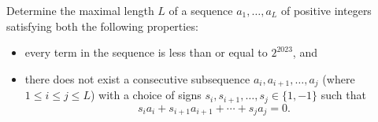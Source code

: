 Determine the maximal length $L$ of a sequence $a_1, \ldots, a_L$ of positive integers satisfying both the following properties:

\begin{itemize}
\item every term in the sequence is less than or equal to $2^{2023}$, and
\item there does not exist a consecutive subsequence $a_i, a_{i+1}, \ldots, a_j$ (where $1 \leq i \leq j \leq L$) with a choice of signs $s_i, s_{i+1}, \ldots, s_j \in \{1, -1\}$ such that
\[
s_i a_i + s_{i+1} a_{i+1} + \cdots + s_j a_j = 0.
\]
\end{itemize}
